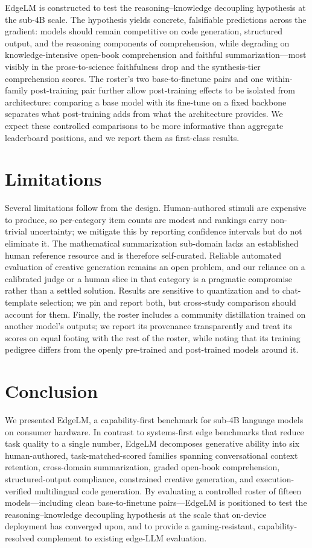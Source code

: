 \documentclass[runningheads]{llncs}
\begin{document}
EdgeLM is constructed to test the reasoning--knowledge decoupling hypothesis at
the sub-4B scale. The hypothesis yields concrete, falsifiable predictions across
the gradient: models should remain competitive on code generation, structured
output, and the reasoning components of comprehension, while degrading on
knowledge-intensive open-book comprehension and faithful summarization---most
visibly in the prose-to-science faithfulness drop and the synthesis-tier
comprehension scores. The roster's two base-to-finetune pairs and one
within-family post-training pair further allow post-training effects to be
isolated from architecture: comparing a base model with its fine-tune on a fixed
backbone separates what post-training adds from what the architecture provides.
We expect these controlled comparisons to be more informative than aggregate
leaderboard positions, and we report them as first-class results.

\section{Limitations}
\label{sec:limitations}

Several limitations follow from the design. Human-authored stimuli are expensive
to produce, so per-category item counts are modest and rankings carry
non-trivial uncertainty; we mitigate this by reporting confidence intervals but
do not eliminate it. The mathematical summarization sub-domain lacks an
established human reference resource and is therefore self-curated. Reliable
automated evaluation of creative generation remains an open problem, and our
reliance on a calibrated judge or a human slice in that category is a pragmatic
compromise rather than a settled solution. Results are sensitive to quantization
and to chat-template selection; we pin and report both, but cross-study
comparison should account for them. Finally, the roster includes a community
distillation trained on another model's outputs; we report its provenance
transparently and treat its scores on equal footing with the rest of the roster,
while noting that its training pedigree differs from the openly pre-trained and
post-trained models around it.

\section{Conclusion}
\label{sec:conclusion}

We presented EdgeLM, a capability-first benchmark for sub-4B language models on
consumer hardware. In contrast to systems-first edge benchmarks that reduce task
quality to a single number, EdgeLM decomposes generative ability into six
human-authored, task-matched-scored families spanning conversational context
retention, cross-domain summarization, graded open-book comprehension,
structured-output compliance, constrained creative generation, and
execution-verified multilingual code generation. By evaluating a controlled
roster of fifteen models---including clean base-to-finetune pairs---EdgeLM is
positioned to test the reasoning--knowledge decoupling hypothesis at the scale
that on-device deployment has converged upon, and to provide a gaming-resistant,
capability-resolved complement to existing edge-LLM evaluation.
\end{document}
